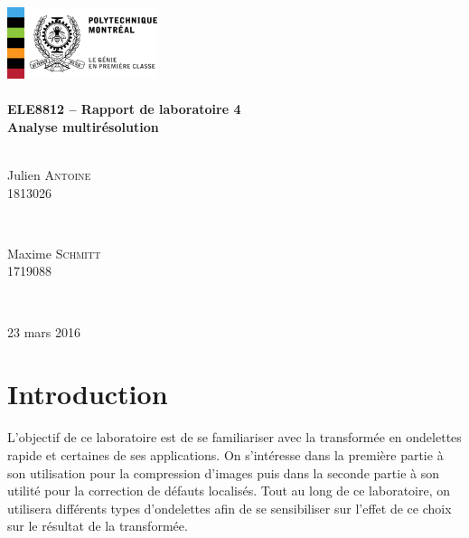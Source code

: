 \documentclass[12pt]{article}
\begin{document}
\begin{titlepage}
\centering
\includegraphics[width = 0.33\textwidth]{../../logo}\\[5cm] 
\centering
\HRule \\[0.4cm]
{ \huge \bfseries ELE8812 -- Rapport de laboratoire 4}\\[0.4cm] 
{ \Large \bfseries Analyse multirésolution}\\
\HRule \\[1cm]
\begin{minipage}{0.45\textwidth}
\begin{center} 
\large
Julien \textsc{Antoine}\\
1813026
\end{center}
\end{minipage}
~
\begin{minipage}{0.45\textwidth}
\begin{center} 
\large
Maxime \textsc{Schmitt}\\
1719088
\end{center}
\end{minipage}\\[8cm]
\begin{center}
{\Large 23 mars 2016}
\end{center}
\vfill 
\end{titlepage}



\section{Introduction}
L'objectif de ce laboratoire est de se familiariser avec la transformée en ondelettes
rapide et certaines de ses applications. On s'intéresse dans la première partie à son
utilisation pour la compression d'images puis dans la seconde partie à son utilité pour
la correction de défauts localisés. Tout au long de ce laboratoire, on utilisera
différents types d'ondelettes afin de se sensibiliser sur l'effet de ce choix sur le
résultat de la transformée.
\end{document}
